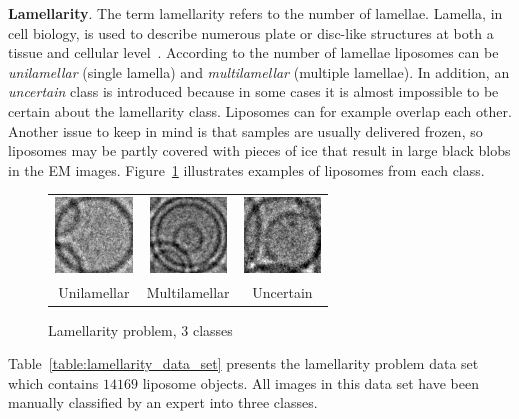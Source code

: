 \documentclass[a4paper, 11pt, table]{article}
\begin{document}
\textbf{Lamellarity}. The term lamellarity refers to the number of lamellae. Lamella, in cell biology, is used to describe numerous plate or disc-like structures at both a tissue and cellular level~\cite{cammack2006oxford}. According to the number of lamellae liposomes can be \textit{unilamellar} (single lamella) and \textit{multilamellar} (multiple lamellae). In addition, an \textit{uncertain} class is introduced because in some cases it is almost impossible to be certain about  the lamellarity class. Liposomes can for example overlap each other. Another issue to keep in mind is that samples are usually delivered frozen, so liposomes may be partly covered with pieces of ice that result in large black blobs in the EM images. Figure~\ref{fig:lamellarity_problem} illustrates examples of liposomes from each class.

\begin{figure}[H]
\centering
\begin{tabular}{ccc}
	\includegraphics[height=2cm, keepaspectratio]{problem_description/lamellarity/uni} & \includegraphics[height=2cm, keepaspectratio]{problem_description/lamellarity/multi} & \includegraphics[height=2cm, keepaspectratio]{problem_description/lamellarity/uncertain} \\
	Unilamellar & Multilamellar & Uncertain \\[6pt]
\end{tabular}
\caption{Lamellarity problem, 3 classes}
\label{fig:lamellarity_problem}
\end{figure}

Table~\ref{table:lamellarity_data_set} presents the lamellarity problem data set which contains $\num{14169}$ liposome objects. All images in this data set have been manually classified by an expert into three classes.
\end{document}
